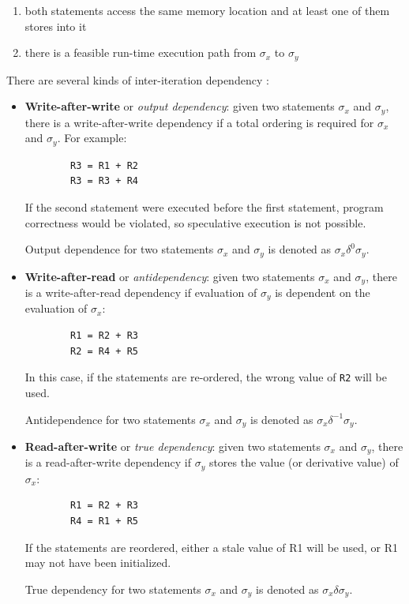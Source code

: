 	\begin{enumerate}
		\item both statements access the same memory location and at least one of them stores into it
		\item there is a feasible run-time execution path from $\sigma_x$ to $\sigma_y$
	\end{enumerate}
	
	There are several kinds of inter-iteration dependency \citep[p.~526]{Ibbett2009,ArchitectureBook}:
	
	\begin{itemize}\label{fig:dep-kinds}
		\item \textbf{Write-after-write} or \textit{output dependency}: given two statements $\sigma_x$ and $\sigma_y$, there is a write-after-write dependency if a total ordering is required for $\sigma_x$ and $\sigma_y$. For example:
		
		\begin{verbatim}
		R3 = R1 + R2
		R3 = R3 + R4
		\end{verbatim}
		
		If the second statement were executed before the first statement, program correctness would be violated, so speculative execution is not possible.
		
		Output dependence for two statements $\sigma_x$ and $\sigma_y$ is denoted as $\sigma_x \delta^0 \sigma_y$.
		
		\item \textbf{Write-after-read} or \textit{antidependency}: given two statements $\sigma_x$ and $\sigma_y$, there is a write-after-read dependency if evaluation of $\sigma_y$ is dependent on the evaluation of $\sigma_x$:
		
		\begin{verbatim}
		R1 = R2 + R3
		R2 = R4 + R5
		\end{verbatim}
		
		In this case, if the statements are re-ordered, the wrong value of \texttt{R2} will be used.
		
		Antidependence for two statements $\sigma_x$ and $\sigma_y$ is denoted as $\sigma_x \delta^{-1} \sigma_y$.
		
		\item \textbf{Read-after-write} or \textit{true dependency}: given two statements $\sigma_x$ and $\sigma_y$, there is a read-after-write dependency if $\sigma_y$ stores the value (or derivative value) of $\sigma_x$:
		
		\begin{verbatim}
		R1 = R2 + R3
		R4 = R1 + R5
		\end{verbatim}
		
		If the statements are reordered, either a stale value of R1 will be used, or R1 may not have been initialized.
		
		True dependency for two statements $\sigma_x$ and $\sigma_y$ is denoted as $\sigma_x \delta \sigma_y$.
	\end{itemize}
	
